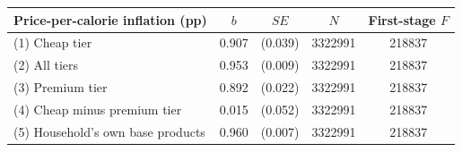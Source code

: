 \setlength{\tabcolsep}{4pt}
\begin{tabular}{
    l
    S[table-format=1.3, table-space-text-post=\sym{***}, table-align-text-after=false]
    S[table-format=1.3, table-space-text-pre={(}, table-align-text-before=false, table-space-text-post={)}, table-align-text-after=false]
    S[table-format=9]
    S[table-format=7]
}
\toprule
Price-per-calorie inflation (pp) & {\(b\)} & {\(\mathit{SE}\)} & {\(N\)} & {First-stage \(F\)} \\
\midrule
(1) Cheap tier & 0.907\sym{***} & {(}0.039{)} & 3322991 & 218837 \\
(2) All tiers & 0.953\sym{***} & {(}0.009{)} & 3322991 & 218837 \\
(3) Premium tier & 0.892\sym{***} & {(}0.022{)} & 3322991 & 218837 \\
(4) Cheap minus premium tier & 0.015 & {(}0.052{)} & 3322991 & 218837 \\
(5) Household's own base products & 0.960\sym{***} & {(}0.007{)} & 3322991 & 218837 \\
\bottomrule
\end{tabular}
